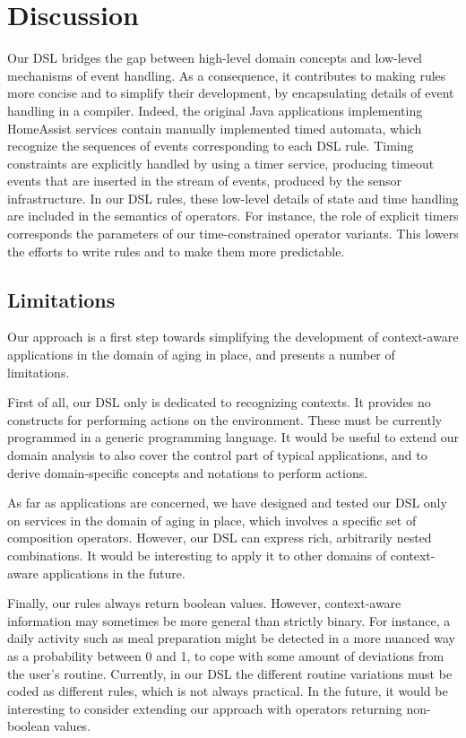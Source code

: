 \section{Discussion}

Our DSL bridges the gap between high-level domain concepts and low-level mechanisms of event handling. As a consequence, it contributes to making rules more concise and  to simplify their development, by encapsulating details of event handling in a compiler.  Indeed, the original Java applications implementing HomeAssist services contain manually implemented timed automata, which recognize the sequences of events corresponding to each DSL rule.  Timing constraints are explicitly handled by using a timer service, producing timeout events that are inserted in the stream of events, produced by the sensor infrastructure.  In our DSL rules, these low-level details of state and time handling are included in the semantics of operators.  For instance, the role of explicit timers corresponds the parameters of our time-constrained operator variants. This lowers the efforts to write rules and to make them more predictable.

\subsection*{Limitations}

Our approach is a first step towards simplifying the development of context-aware applications in the domain of aging in place, and presents a number of limitations.

First of all, our DSL only is dedicated to recognizing contexts. It provides no constructs for performing actions on the environment. These must be currently programmed in a generic programming language. It would be useful to extend our domain analysis to also cover the control part of typical applications, and to derive domain-specific concepts and notations to perform actions.

As far as applications are concerned, we have designed and tested our DSL only on services in the domain of aging in place, which involves a specific set of composition operators. However, our DSL can express rich, arbitrarily nested combinations. It would be interesting to apply it to other domains of context-aware applications in the future.

Finally, our rules always return boolean values. However, context-aware information may sometimes be more general than strictly binary. For instance, a daily activity such as meal preparation might be detected in a more nuanced way as a probability between 0 and 1, to cope with some amount of deviations from the user's routine. Currently, in our DSL the different routine variations must be coded as different rules, which is not always practical. In the future, it would be interesting to consider extending our approach with operators returning non-boolean values.

